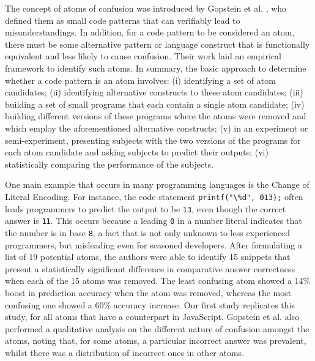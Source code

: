 The concept of atoms of confusion was introduced by Gopstein et al. \cite{DBLP:conf/msr/GopsteinZFC18}, who defined them as small code patterns that can verifiably lead to misunderstandings. In addition, for a code pattern to be considered an atom, there must be some alternative pattern or language construct that is functionally equivalent and less likely to cause confusion. Their work laid an empirical framework to identify such atoms. In summary, the basic approach to determine whether a code pattern is an atom involves: (i) identifying a set of atom candidates; (ii) identifying alternative constructs to these atom candidates; (iii) building a set of small programs that each contain a single atom candidate; (iv) building different versions of these programs where the atoms were removed and which employ the aforementioned alternative constructs; (v) in an experiment or semi-experiment, presenting subjects with the two versions of the programs for each atom candidate and asking subjects to predict their outputs; (vi) statistically comparing the performance of the subjects.

One main example that occurs in many programming languages is the Change of Literal Encoding. For instance, the \clang code statement \lstinline{printf("\%d", 013);} 
often leads programmers to predict the output to be \texttt{13}, even though the correct answer is \texttt{11}. This occurs because a leading \texttt{0} in a number literal indicates that the number is in base \texttt{8}, a fact that is not only unknown to less experienced programmers, but misleading even for seasoned developers. After formulating a list of 19 potential atoms, the authors were able to identify 15 snippets that present a statistically significant difference in comparative answer correctness when each of the 15 atoms was removed. The least confusing atom showed a 14\% boost in prediction accuracy when the atom was removed, whereas the most confusing one showed a 60\% accuracy increase. Our first study replicates this study, for all atoms that have a counterpart in JavaScript. Gopstein et al. \cite{DBLP:conf/msr/GopsteinZFC18} also performed a qualitative analysis on the different nature of confusion amongst the atoms, noting that, for some atoms, a particular incorrect answer was prevalent, whilst there was a distribution of incorrect ones in other atoms. 

